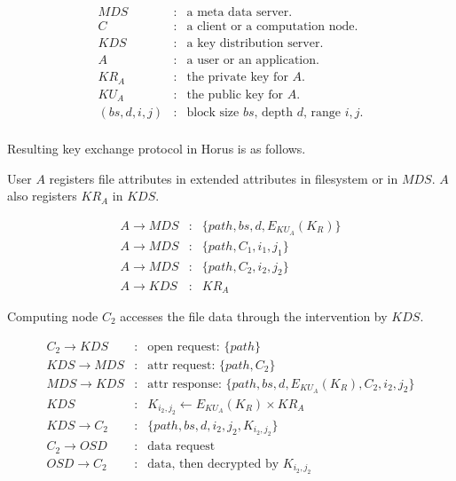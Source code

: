 \documentclass[11pt]{article}
\newcommand{\mds}{\ensuremath{\mathit{MDS}}}
\newcommand{\kds}{\ensuremath{\mathit{KDS}}}
\newcommand{\osd}{\ensuremath{\mathit{OSD}}}
\begin{document}
\begin{eqnarray*}
   \mds & : & \mbox{a meta data server.} \\
   C    & : & \mbox{a client or a computation node.} \\
   \kds & : & \mbox{a key distribution server.} \\
   A    & : & \mbox{a user or an application.} \\
   \textit{KR}_A & : & \mbox{the private key for $A$.} \\
   \textit{KU}_A & : & \mbox{the public key for $A$.} \\
   (bs,d,i,j) & : & \mbox{block size $bs$, depth $d$, range $i,j$.} \\
\end{eqnarray*}

\clearpage

Resulting key exchange protocol in Horus is as follows.

User $A$ registers file attributes in extended attributes
in filesystem or in $\mds$. $A$ also registers $KR_A$ in $\kds$.

\begin{eqnarray}
A \rightarrow \mds & : & \{ path, bs, d, E_{KU_A}(K_R) \} \\
A \rightarrow \mds & : & \{ path, C_1, i_1, j_1 \} \\
A \rightarrow \mds & : & \{ path, C_2, i_2, j_2 \} \\
A \rightarrow \kds & : & KR_A
\end{eqnarray}

Computing node $C_2$ accesses the file data through the intervention
by $\kds$.

\begin{eqnarray}
C_2 \rightarrow \kds & : & \mbox{open request: } \{ path \} \\
\kds \rightarrow \mds & : & \mbox{attr request: } \{ path,C_2 \} \\
\mds \rightarrow \kds & : & \mbox{attr response: } \{ path,bs,d,E_{KU_A}(K_R),C_2,i_2,j_2 \} \\
\kds         & : & K_{i_2,j_2} \leftarrow E_{KU_A}(K_R) \times KR_A \\
\kds \rightarrow C_2 & : & \{ path, bs, d, i_2, j_2, K_{i_2,j_2} \} \\
C_2 \rightarrow \osd & : & \mbox{data request} \\
\osd \rightarrow C_2 & : & \mbox{data, then decrypted by } K_{i_2,j_2}
\end{eqnarray}
\end{document}
